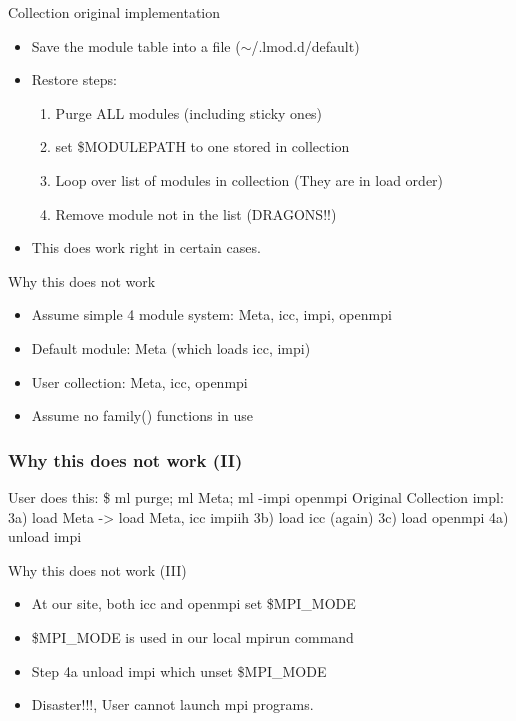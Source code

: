 \documentclass{beamer}
\begin{document}
\begin{frame}{Collection original implementation}
  \begin{itemize}
    \item Save the module table into a file ($\sim$/.lmod.d/default)
    \item Restore steps:
      \begin{enumerate}
        \item Purge ALL modules (including sticky ones)
        \item set \$MODULEPATH to one stored in collection
        \item Loop over list of modules in collection (They are in
          load order)
        \item Remove module not in the list {\color{red} (DRAGONS!!)}
      \end{enumerate}
    \item This does work right in certain cases.
  \end{itemize}
\end{frame}

\begin{frame}{Why this does not work}
  \begin{itemize}
    \item Assume simple 4 module system: Meta, icc, impi, openmpi
    \item Default module: Meta (which loads icc, impi)
    \item User collection: Meta, icc, openmpi
    \item Assume no family() functions in use
  \end{itemize}
\end{frame}

\begin{frame}[fragile]
  \frametitle{Why this does not work (II)}
    {\small
\begin{semiverbatim}
User does this:
   \$ ml purge; ml Meta; ml -impi openmpi
Original Collection impl:
   3a) load Meta -> load Meta, icc impiih
   3b) load icc (again)
   3c) load openmpi
   4a) unload impi
\end{semiverbatim}
    }
\end{frame}

\begin{frame}{Why this does not work (III)}
  \begin{itemize}
    \item At our site, both icc and openmpi set \$MPI\_MODE
    \item \$MPI\_MODE is used in our local mpirun command
    \item Step 4a unload impi which unset \$MPI\_MODE
    \item Disaster!!!, User cannot launch mpi programs.
  \end{itemize}
\end{frame}
\end{document}
